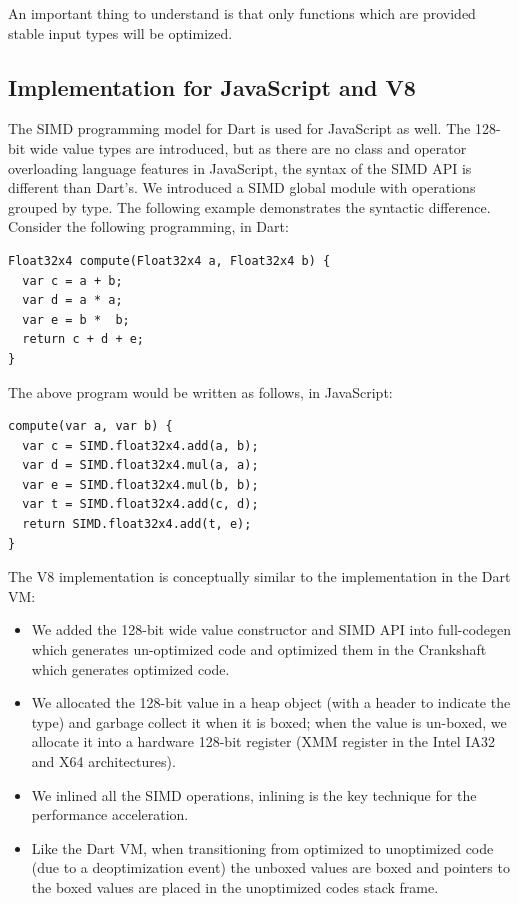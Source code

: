 \documentclass[preprint]{sigplanconf}
\begin{document}
An important thing to understand is that only functions which are provided
stable input types will be optimized.

\subsection{Implementation for JavaScript and V8}
\label{V8}

The SIMD programming model for Dart is used for JavaScript as well. The 128-bit
wide value types are introduced, but as there are no class and operator
overloading language features in JavaScript, the syntax of the SIMD API is
different than Dart's. We introduced a SIMD global module with operations
grouped by type. The following example demonstrates the syntactic difference.
Consider the following programming, in Dart:

\begin{small}
\begin{lstlisting}
Float32x4 compute(Float32x4 a, Float32x4 b) {
  var c = a + b;
  var d = a * a;
  var e = b *  b;
  return c + d + e;
}
\end{lstlisting}
\end{small}

The above program would be written as follows, in JavaScript:

\begin{small}
\begin{lstlisting}
compute(var a, var b) {
  var c = SIMD.float32x4.add(a, b);
  var d = SIMD.float32x4.mul(a, a);
  var e = SIMD.float32x4.mul(b, b);
  var t = SIMD.float32x4.add(c, d);
  return SIMD.float32x4.add(t, e);
}
\end{lstlisting}
\end{small}

The V8 implementation is conceptually similar to the implementation in the Dart
VM:

\begin{itemize}
\item
We added the 128-bit wide value constructor and SIMD API into full-codegen which
generates un-optimized code and optimized them in the Crankshaft which generates
optimized code.

\item
We allocated the 128-bit value in a heap object (with a header to indicate the
type) and garbage collect it when it is boxed; when the value is un-boxed, we
allocate it into a hardware 128-bit register (XMM register in the Intel IA32 and
X64 architectures).

\item
We inlined all the SIMD operations, inlining is the key technique for the
performance acceleration.

\item
Like the Dart VM, when transitioning from optimized to unoptimized code (due to
a deoptimization event) the unboxed values are boxed and pointers to the boxed
values are placed in the unoptimized codes stack frame.

\end{itemize}
\end{document}

